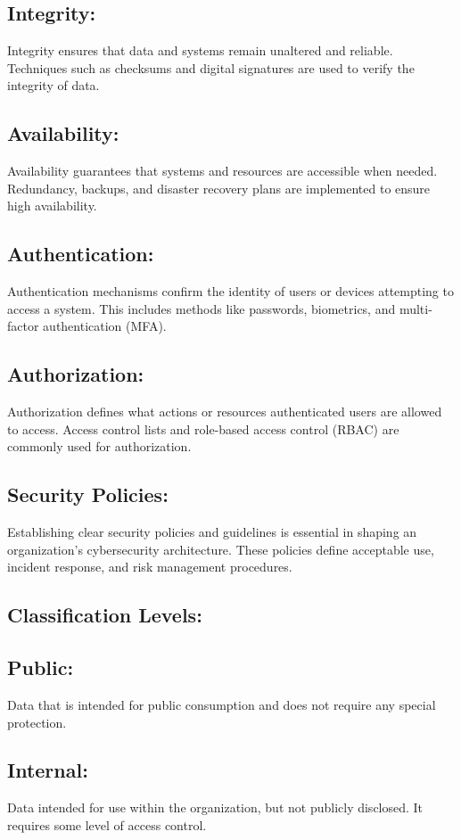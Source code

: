 \documentclass[12pt]{report}
\begin{document}
\subsection*{Integrity:} Integrity ensures that data and systems remain unaltered and reliable. Techniques such as checksums and digital signatures are used to verify the integrity of data.
\subsection*{Availability:} Availability guarantees that systems and resources are accessible when needed. Redundancy, backups, and disaster recovery plans are implemented to ensure high availability.\cite{remote}
\subsection*{Authentication:} Authentication mechanisms confirm the identity of users or devices attempting to access a system. This includes methods like passwords, biometrics, and multi-factor authentication (MFA).
\subsection*{Authorization:} Authorization defines what actions or resources authenticated users are allowed to access. Access control lists and role-based access control (RBAC) are commonly used for authorization.
\subsection*{Security Policies:} Establishing clear security policies and guidelines is essential in shaping an organization's cybersecurity architecture. These policies define acceptable use, incident response, and risk management procedures.\cite{ChatGPT}
\subsection*{Classification Levels:}
\subsection*{Public:}  Data that is intended for public consumption and does not require any special protection.
\subsection*{Internal:} Data intended for use within the organization, but not publicly disclosed. It requires some level of access control.
\end{document}
